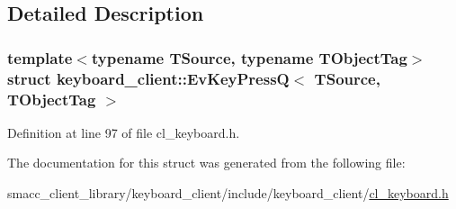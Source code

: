 \subsection{Detailed Description}
\subsubsection*{template$<$typename T\+Source, typename T\+Object\+Tag$>$\newline
struct keyboard\+\_\+client\+::\+Ev\+Key\+Press\+Q$<$ T\+Source, T\+Object\+Tag $>$}



Definition at line 97 of file cl\+\_\+keyboard.\+h.



The documentation for this struct was generated from the following file\+:\begin{DoxyCompactItemize}
\item 
smacc\+\_\+client\+\_\+library/keyboard\+\_\+client/include/keyboard\+\_\+client/\hyperlink{cl__keyboard_8h}{cl\+\_\+keyboard.\+h}\end{DoxyCompactItemize}
